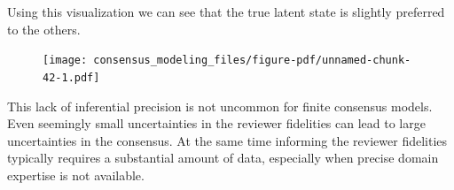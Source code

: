 \documentclass[
  letterpaper,
  DIV=11,
  numbers=noendperiod]{scrartcl}
\newenvironment{Shaded}{\begin{snugshade}}{\end{snugshade}}
\newcommand{\AttributeTok}[1]{\textcolor[rgb]{0.40,0.45,0.13}{#1}}
\newcommand{\ControlFlowTok}[1]{\textcolor[rgb]{0.00,0.23,0.31}{#1}}
\newcommand{\DecValTok}[1]{\textcolor[rgb]{0.68,0.00,0.00}{#1}}
\newcommand{\FunctionTok}[1]{\textcolor[rgb]{0.28,0.35,0.67}{#1}}
\newcommand{\NormalTok}[1]{\textcolor[rgb]{0.00,0.23,0.31}{#1}}
\newcommand{\OtherTok}[1]{\textcolor[rgb]{0.00,0.23,0.31}{#1}}
\newcommand{\SpecialCharTok}[1]{\textcolor[rgb]{0.37,0.37,0.37}{#1}}
\newcommand{\StringTok}[1]{\textcolor[rgb]{0.13,0.47,0.30}{#1}}
\begin{document}
Using this visualization we can see that the true latent state is
slightly preferred to the others.

\begin{Shaded}
\end{Shaded}

\begin{figure}[H]

{\centering \texttt{[image: consensus\_modeling\_files/figure-pdf/unnamed-chunk-42-1.pdf]}

}

\end{figure}

This lack of inferential precision is not uncommon for finite consensus
models. Even seemingly small uncertainties in the reviewer fidelities
can lead to large uncertainties in the consensus. At the same time
informing the reviewer fidelities typically requires a substantial
amount of data, especially when precise domain expertise is not
available.
\end{document}
